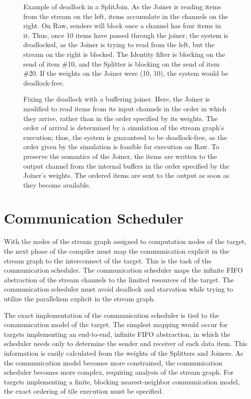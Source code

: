 \begin{figure}
\centering
{}
\parbox{6in}{\caption{\protect\small Example of deadlock in a
SplitJoin.  As the Joiner is reading items from the stream on the
left, items accumulate in the channels on the right.  On Raw, senders
will block once a channel has four items in it.  Thus, once 10 items
have passed through the joiner, the system is deadlocked, as the
Joiner is trying to read from the left, but the stream on the right is
blocked.  The Identity filter is blocking on the send of item \#10,
and the Splitter is blocking on the send of item \#20.  If the weights
on the Joiner were (10, 10), the system would be deadlock-free.
\protect\label{fig:joiner-dead}}}

\vspace{48pt}

\caption{\protect\small Fixing the deadlock with a buffering joiner.
Here, the Joiner is modified to read items from its input channels in
the order in which they arrive, rather than in the order specified by
its weights.  The order of arrival is determined by a simulation of
the stream graph's execution; thus, the system is guaranteed to be
deadlock-free, as the order given by the simulation is feasible for
execution on Raw.  To preserve the semantics of the Joiner, the items
are written to the output channel from the internal buffers in the
order specified by the Joiner's weights.  The ordered items are sent
to the output as soon as they become available.
\protect\label{fig:joiner-live}}
\end{figure}

\section{Communication Scheduler}
\label{sec:communic}

With the nodes of the stream graph assigned to computation nodes of
the target, the next phase of the compiler must map the communication
explicit in the stream graph to the interconnect of the target.  This
is the task of the communication scheduler.  The communication
scheduler maps the infinite FIFO abstraction of the stream channels to
the limited resources of the target.  The communication scheduler must
avoid deadlock and starvation while trying to utilize the parallelism
explicit in the stream graph.

The exact implementation of the communication scheduler is tied to the
communication model of the target.  The simplest mapping would occur
for targets implementing an end-to-end, infinite FIFO abstraction, in
which the scheduler needs only to determine the sender and receiver of
each data item.  This information is easily calculated from the
weights of the Splitters and Joiners.  As the communication model
becomes more constrained, the communication scheduler becomes more
complex, requiring analysis of the stream graph. For targets
implementing a finite, blocking nearest-neighbor communication model,
the exact ordering of tile execution must be specified.


